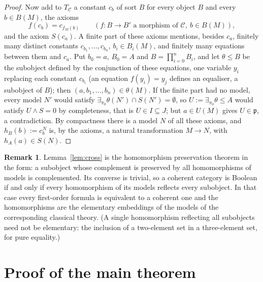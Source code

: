 \documentclass[11pt]{amsart}
\theoremstyle{definition}
\newtheorem{rem}[thm]{Remark}
\newcommand{\cC}{\mathcal C}
\begin{document}
\begin{proof}
Now add to $T_\cC$ a constant $c_b$ of sort $B$ for every object $B$
and every $b\in B(M)$, the axioms
\[
f(c_b)=c_{f_M(b)}\qquad(f\colon B\to B'\text{ a morphism of }\cC,\ b\in
B(M)),
\]
and the axiom $S(c_a)$. A finite part of these axioms mentions, besides
$c_a$, finitely many distinct constants $c_{b_1},\dots,c_{b_n}$,
$b_i\in B_i(M)$, and finitely many equations between them and $c_a$.
Put $b_0=a$, $B_0=A$ and $B=\prod_{i=0}^nB_i$, and let $\theta\le B$ be
the subobject defined by the conjunction of these equations, one
variable $y_i$ replacing each constant $c_{b_i}$ (an equation
$f(y_i)=y_j$ defines an equaliser, a subobject of $B$); then
$(a,b_1,\dots,b_n)\in\theta(M)$. If the finite part had no model, every
model $N'$ would satisfy $\exists_{\pi_0}\theta(N')\cap S(N')=
\emptyset$, so $U:=\exists_{\pi_0}\theta\le A$ would satisfy $U\wedge
S=0$ by completeness, that is $U\in I\subseteq J$; but $a\in U(M)$
gives $U\in\mathfrak p$, a contradiction. By compactness there is a
model $N$ of all these axioms, and $h_B(b):=c_b^N$ is, by the axioms, a
natural transformation $M\to N$, with $h_A(a)\in S(N)$.
\end{proof}

\begin{rem}
Lemma~\ref{lem:cross} is the homomorphism preservation theorem in the
form: a subobject whose complement is preserved by all homomorphisms of
models is complemented. Its converse is trivial, so a coherent category
is Boolean if and only if every homomorphism of its models reflects
every subobject. In that case every first-order formula is equivalent
to a coherent one and the homomorphisms are the elementary embeddings
of the models of the corresponding classical theory. (A single
homomorphism reflecting all subobjects need not be elementary: the
inclusion of a two-element set in a three-element set, for pure
equality.)
\end{rem}

\section{Proof of the main theorem}
\end{document}
